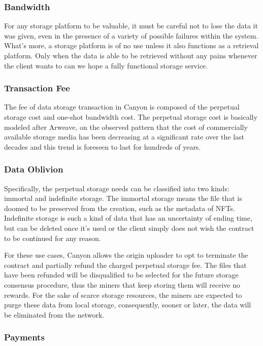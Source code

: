 \documentclass[]{article}
\begin{document}
\subsubsection{Bandwidth}

For any storage platform to be valuable, it must be careful not to lose the data it was given, even in the presence of a variety of possible failures within the system. What's more, a storage platform is of no use unless it also functions as a retrieval platform. Only when the data is able to be retrieved without any pains whenever the client wants to can we hope a fully functional storage service.

\subsubsection{Transaction Fee}

The fee of data storage transaction in Canyon is composed of the perpetual storage cost and one-shot bandwidth cost. The perpetual storage cost is basically modeled after Arweave, on the observed pattern that the cost of commercially available storage media has been decreasing at a significant rate over the last decades and this trend is foreseen to last for hundreds of years.

\subsubsection{Data Oblivion}

Specifically, the perpetual storage needs can be classified into two kinds: immortal and indefinite storage. The immortal storage means the file that is doomed to be preserved from the creation, such as the metadata of NFTs. Indefinite storage is such a kind of data that has an uncertainty of ending time, but can be deleted once it's used or the client simply does not wish the contract to be continued for any reason.

For these use cases, Canyon allows the origin uploader to opt to terminate the contract and partially refund the charged perpetual storage fee. The files that have been refunded will be disqualified to be selected for the future storage consensus procedure, thus the miners that keep storing them will receive no rewards. For the sake of scarce storage resources, the miners are expected to purge these data from local storage, consequently, sooner or later, the data will be eliminated from the network.

\subsubsection{Payments}
\end{document}
